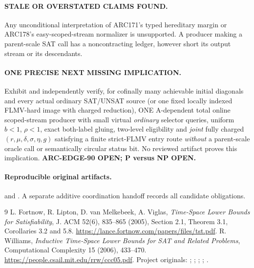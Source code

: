 \documentclass[11pt]{article}
\begin{document}
\paragraph{STALE OR OVERSTATED CLAIMS FOUND.}
Any unconditional interpretation of ARC171's typed
hereditary margin or ARC178's easy-scoped-stream
normalizer is unsupported. A producer making a
parent-scale SAT call has a noncontracting ledger,
however short its output stream or its descendants.

\paragraph{ONE PRECISE NEXT MISSING IMPLICATION.}
Exhibit and independently verify, for cofinally many
achievable initial diagonals and every actual ordinary
SAT/UNSAT source (or one fixed locally indexed
FLMV-hard image with charged reduction), ONE
A-dependent total online scoped-stream producer with
small virtual \emph{ordinary} selector queries,
uniform $b<1$, $\rho<1$, exact both-label gluing,
two-level eligibility and \emph{joint} fully charged
$(r,\mu,\delta,\sigma,\eta,g)$ satisfying a finite
strict-FLMV entry route \emph{without} a parent-scale
oracle call or semantically circular status bit.
No reviewed artifact proves this implication.
\textbf{ARC-EDGE-90 OPEN; P versus NP OPEN.}

\paragraph{Reproducible original artifacts.}
and .
A separate additive coordination handoff records all candidate obligations.

\begin{thebibliography}{9}
 L. Fortnow, R. Lipton, D. van Melkebeek, A. Viglas,
\emph{Time-Space Lower Bounds for Satisfiability},
J. ACM 52(6), 835--865 (2005), Section 2.1, Theorem 3.1,
Corollaries 3.2 and 5.8.
\url{https://lance.fortnow.com/papers/files/tst.pdf}.
 R. Williams, \emph{Inductive Time-Space Lower Bounds
for SAT and Related Problems}, Computational Complexity 15 (2006),
433--470. \url{https://people.csail.mit.edu/rrw/ccc05.pdf}.
 Project originals:
;
;
;
;
.
\end{thebibliography}
\end{document}
